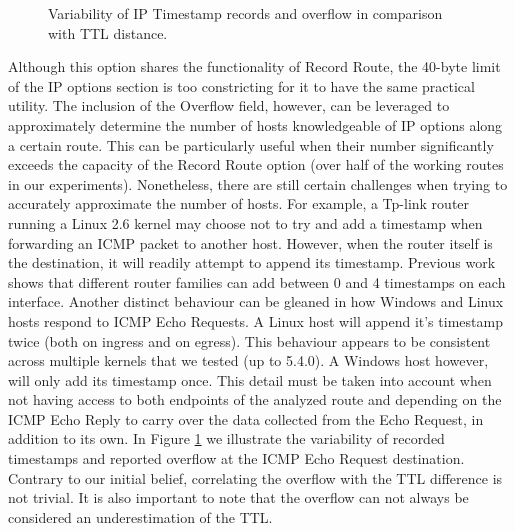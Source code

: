 \begin{figure}[htb]
        \hbox{\centering \scalebox{1.0}{}}
    \caption{Variability of IP Timestamp records and overflow in comparison with TTL distance.}
    \label{extend:ops:fig:ttl-ovf}
\end{figure}

Although this option shares the functionality of Record Route, the 40-byte limit of the IP options section is too constricting for it to have the same practical utility. The inclusion of the Overflow field, however, can be leveraged to approximately determine the number of hosts knowledgeable of IP options along a certain route. This can be particularly useful when their number significantly exceeds the capacity of the Record Route option (over half of the working routes in our experiments). Nonetheless, there are still certain challenges when trying to accurately approximate the number of hosts. For example, a Tp-link router running a Linux 2.6 kernel may choose not to try and add a timestamp when forwarding an ICMP packet to another host. However, when the router itself is the destination, it will readily attempt to append its timestamp. Previous work \cite{marchetta2017measuring} shows that different router families can add between 0 and 4 timestamps on each interface. Another distinct behaviour can be gleaned in how Windows and Linux hosts respond to ICMP Echo Requests. A Linux host will append it's timestamp twice (both on ingress and on egress). This behaviour appears to be consistent across multiple kernels that we tested (up to 5.4.0). A Windows host however, will only add its timestamp once. This detail must be taken into account when not having access to both endpoints of the analyzed route and depending on the ICMP Echo Reply to carry over the data collected from the Echo Request, in addition to its own. In Figure \ref{extend:ops:fig:ttl-ovf} we illustrate the variability of recorded timestamps and reported overflow at the ICMP Echo Request destination. Contrary to our initial belief, correlating the overflow with the TTL difference is not trivial. It is also important to note that the overflow can not always be considered an underestimation of the TTL.



